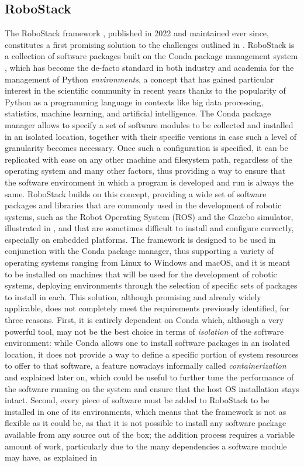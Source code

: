 \subsection{RoboStack}
\label{sec:related_work_robostack}
The RoboStack framework \cite{fischer_robostack_2022}, published in 2022 and maintained ever since, constitutes a first promising solution to the challenges outlined in . RoboStack is a collection of software packages built on the Conda package management system \cite{anaconda_inc_conda_nodate}, which has become the de-facto standard in both industry and academia for the management of Python \emph{environments}, a concept that has gained particular interest in the scientific community in recent years thanks to the popularity of Python as a programming language in contexts like big data processing, statistics, machine learning, and artificial intelligence. The Conda package manager allows to specify a set of software modules to be collected and installed in an isolated location, together with their specific versions in case such a level of granularity becomes necessary. Once such a configuration is specified, it can be replicated with ease on any other machine and filesystem path, regardless of the operating system and many other factors, thus providing a way to ensure that the software environment in which a program is developed and run is always the same. RoboStack builds on this concept, providing a wide set of software packages and libraries that are commonly used in the development of robotic systems, such as the Robot Operating System (ROS) and the Gazebo simulator, illustrated in , and that are sometimes difficult to install and configure correctly, especially on embedded platforms. The framework is designed to be used in conjunction with the Conda package manager, thus supporting a variety of operating systems ranging from Linux to Windows and macOS, and it is meant to be installed on machines that will be used for the development of robotic systems, deploying environments through the selection of specific sets of packages to install in each. This solution, although promising and already widely applicable, does not completely meet the requirements previously identified, for three reasons. First, it is entirely dependent on Conda which, although a very powerful tool, may not be the best choice in terms of \emph{isolation} of the software environment: while Conda allows one to install software packages in an isolated location, it does not provide a way to define a specific portion of system resources to offer to that software, a feature nowadays informally called \emph{containerization} and explained later on, which could be useful to further tune the performance of the software running on the system and ensure that the host OS installation stays intact. Second, every piece of software must be added to RoboStack to be installed in one of its environments, which means that the framework is not as flexible as it could be, as that it is not possible to install any software package available from any source out of the box; the addition process requires a variable amount of work, particularly due to the many dependencies a software module may have, as explained in 